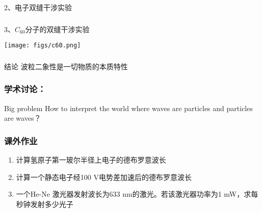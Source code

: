 \begin{frame}{}
    2、电子双缝干涉实验
\end{frame}

\begin{frame}
      \frametitle{}
      3、$C_{60}$分子的双缝干涉实验
    \begin{center}
         \texttt{[image: figs/c60.png]}
    \end{center}
\end{frame}

\begin{frame}
    \frametitle{}   
    \begin{atcbox}{结论}
    {波粒二象性是一切物质的本质特性}
    \end{atcbox} 
        \begin{figure}
            \centering
        \end{figure}
    \setcounter{subfigure}{0}
\end{frame}

\begin{frame}
    \frametitle{学术讨论：}
    \begin{atcbox}{Big problem}
        \large  How to interpret the world where waves are particles and particles are waves？
    \end{atcbox}
\end{frame}

\begin{frame}
    \frametitle{课外作业}
    \begin{enumerate}
        \item 计算氢原子第一玻尔半径上电子的德布罗意波长
        \item 计算一个静态电子经100 V电势差加速后的德布罗意波长
        \item 一个He-Ne 激光器发射波长为633 nm的激光。若该激光器功率为1 mW，求每秒钟发射多少光子
    \end{enumerate}
\end{frame}

